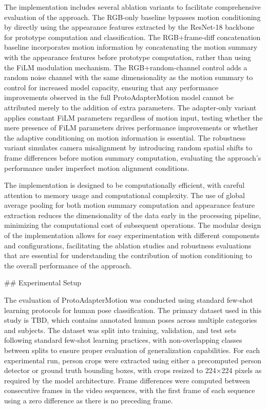 \documentclass[11pt]{article}
\begin{document}
The implementation includes several ablation variants to facilitate comprehensive evaluation of the approach. The RGB-only baseline bypasses motion conditioning by directly using the appearance features extracted by the ResNet-18 backbone for prototype computation and classification. The RGB+frame-diff concatenation baseline incorporates motion information by concatenating the motion summary with the appearance features before prototype computation, rather than using the FiLM modulation mechanism. The RGB+random-channel control adds a random noise channel with the same dimensionality as the motion summary to control for increased model capacity, ensuring that any performance improvements observed in the full ProtoAdapterMotion model cannot be attributed merely to the addition of extra parameters. The adapter-only variant applies constant FiLM parameters regardless of motion input, testing whether the mere presence of FiLM parameters drives performance improvements or whether the adaptive conditioning on motion information is essential. The robustness variant simulates camera misalignment by introducing random spatial shifts to frame differences before motion summary computation, evaluating the approach's performance under imperfect motion alignment conditions.

The implementation is designed to be computationally efficient, with careful attention to memory usage and computational complexity. The use of global average pooling for both motion summary computation and appearance feature extraction reduces the dimensionality of the data early in the processing pipeline, minimizing the computational cost of subsequent operations. The modular design of the implementation allows for easy experimentation with different components and configurations, facilitating the ablation studies and robustness evaluations that are essential for understanding the contribution of motion conditioning to the overall performance of the approach.

## Experimental Setup

The evaluation of ProtoAdapterMotion was conducted using standard few-shot learning protocols for human pose classification. The primary dataset used in this study is TBD, which contains annotated human poses across multiple categories and subjects. The dataset was split into training, validation, and test sets following standard few-shot learning practices, with non-overlapping classes between splits to ensure proper evaluation of generalization capabilities. For each experimental run, person crops were extracted using either a precomputed person detector or ground truth bounding boxes, with crops resized to 224×224 pixels as required by the model architecture. Frame differences were computed between consecutive frames in the video sequences, with the first frame of each sequence using a zero difference as there is no preceding frame.
\end{document}
